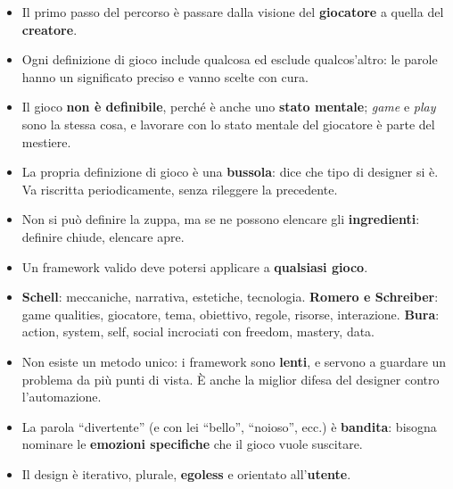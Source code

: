 \begin{itemize}
  \item Il primo passo del percorso è passare dalla visione del
        \textbf{giocatore} a quella del \textbf{creatore}.
  \item Ogni definizione di gioco include qualcosa ed esclude qualcos'altro: le
        parole hanno un significato preciso e vanno scelte con cura.
  \item Il gioco \textbf{non è definibile}, perché è anche uno \textbf{stato
        mentale}; \emph{game} e \emph{play} sono la stessa cosa, e lavorare con
        lo stato mentale del giocatore è parte del mestiere.
  \item La propria definizione di gioco è una \textbf{bussola}: dice che tipo
        di designer si è. Va riscritta periodicamente, senza rileggere la
        precedente.
  \item Non si può definire la zuppa, ma se ne possono elencare gli
        \textbf{ingredienti}: definire chiude, elencare apre.
  \item Un framework valido deve potersi applicare a \textbf{qualsiasi gioco}.
  \item \textbf{Schell}: meccaniche, narrativa, estetiche, tecnologia.
        \textbf{Romero e Schreiber}: game qualities, giocatore, tema,
        obiettivo, regole, risorse, interazione. \textbf{Bura}: action, system,
        self, social incrociati con freedom, mastery, data.
  \item Non esiste un metodo unico: i framework sono \textbf{lenti}, e servono
        a guardare un problema da più punti di vista. È anche la miglior difesa
        del designer contro l'automazione.
  \item La parola ``divertente'' (e con lei ``bello'', ``noioso'', ecc.) è
        \textbf{bandita}: bisogna nominare le \textbf{emozioni specifiche} che
        il gioco vuole suscitare.
  \item Il design è iterativo, plurale, \textbf{egoless} e orientato
        all'\textbf{utente}.
\end{itemize}

